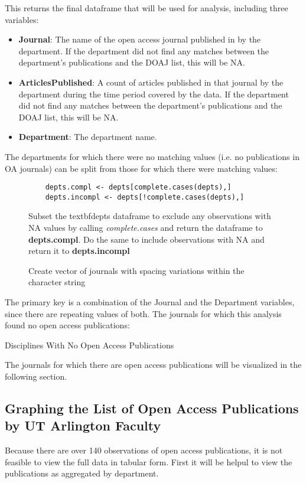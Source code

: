 \documentclass{article}
\begin{document}
This returns the final dataframe that will be used for analysis, including three variables:
\begin{itemize}
	\item \textbf{Journal}: The name of the open access journal published in by the department.
				      If the department did not find any matches between the department's publications and the DOAJ list, this will be NA.
	\item \textbf{ArticlesPublished}: A count of articles published in that journal by the department during the time period covered by the data.
						If the department did not find any matches between the department's publications and the DOAJ list, this will be NA.
	\item \textbf{Department}: The department name.
\end{itemize}

The departments for which there were no matching values (i.e. no publications in OA journals) can be split from those for which there were matching values:
\begin{figure}
	\centering
	\begin{lstlisting}
	depts.compl <- depts[complete.cases(depts),]
	depts.incompl <- depts[!complete.cases(depts),]	
	\end{lstlisting}
	\footnotesize{
		Subset the textbf{depts} dataframe to exclude any observations with NA values by calling \textit{complete.cases} and return the dataframe to \textbf{depts.compl}.
		Do the same to include observations with NA and return it to \textbf{depts.incompl}
			}
	\caption{Create vector of journals with spacing variations within the character string}
\end{figure}
The primary key is a combination of the Journal and the Department variables, since there are repeating values of both.
The journals for which this analysis found no open access publications:
\begin{table}
	\centering
	\caption{Disciplines With No Open Access Publications}
\end{table}
The journals for which there are open access publications will be visualized in the following section.
\subsection{Graphing the List of Open Access Publications by UT Arlington Faculty}
Because there are over 140 observations of open access publications, it is not feasible to view the full data in tabular form.
First it will be helpul to view the publications as aggregated by department.
\end{document}
